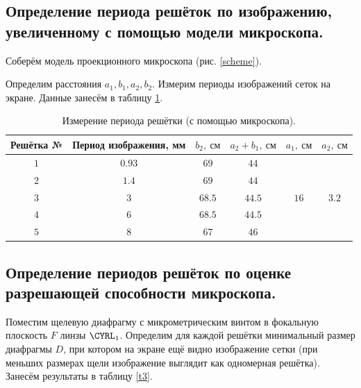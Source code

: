 \documentclass[a4paper, 12pt, twoside]{article}
\begin{document}
	\subsection{Определение периода решёток по изображению, увеличенному с помощью модели микроскопа.}
	
	Соберём модель проекционного микроскопа (рис. \ref{scheme}).
	
	Определим расстояния $a_1, b_1, a_2, b_2$. Измерим периоды изображений сеток на экране. Данные занесём в таблицу \ref{t2}.
	

	\begin{table}[H]
		\centering
		\caption{Измерение периода решётки (с помощью микроскопа).}
		\label{t2}
		\begin{tabular}{c|c|c|c|c|c} \toprule
			Решётка № & Период изображения, мм & $b_2,~\text{см}$ & $a_2+b_1,~\text{см}$ & $a_1,~\text{см}$      & $a_2,~\text{см}$       \\ \midrule
			$1$         & $0.93$                 & $69$             & $44$                 & \multirow{5}{*}{$16$} & \multirow{5}{*}{$3.2$} \\
			$2$         & $1.4$                  & $69$             & $44$                 &                       &                        \\
			$3$         & $3$                    & $68.5$           & $44.5$               &                       &                        \\
			$4$         & $6$                    & $68.5$           & $44.5$               &                       &                        \\
			$5$         & $8$                    & $67$             & $46$                 &                       &                       \\ \bottomrule
		\end{tabular}
	\end{table}

	\subsection{Определение периодов решёток по оценке разрешающей способности микроскопа.}

	Поместим щелевую диафрагму с микрометрическим винтом в фокальную плоскость $F$ линзы $\text{\CYRL}_1$. Определим для каждой решётки минимальный размер диафрагмы $D$, при котором на экране ещё видно изображение сетки (при меньших размерах щели изображение выглядит как одномерная решётка). Занесём результаты в таблицу \ref{t3}.
\end{document}
